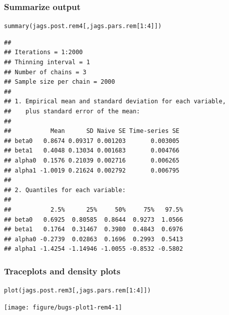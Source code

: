 \documentclass[color=usenames,dvipsnames]{beamer}\usepackage[]{graphicx}\usepackage[]{color}
\makeatletter
\newcommand{\hlnum}[1]{\textcolor[rgb]{0.69,0.494,0}{#1}}%
\newcommand{\hlopt}[1]{\textcolor[rgb]{0,0,0}{#1}}%
\newcommand{\hlstd}[1]{\textcolor[rgb]{0,0,0}{#1}}%
\newcommand{\hlkwd}[1]{\textcolor[rgb]{0.004,0.004,0.506}{#1}}%
\newenvironment{kframe}{%
 \def\at@end@of@kframe{}%
 \ifinner\ifhmode%
  \def\at@end@of@kframe{\end{minipage}}%
  \begin{minipage}{\columnwidth}%
 \fi\fi%
 \def\FrameCommand##1{\hskip\@totalleftmargin \hskip-\fboxsep
 \colorbox{shadecolor}{##1}\hskip-\fboxsep
     \hskip-\linewidth \hskip-\@totalleftmargin \hskip\columnwidth}%
 \MakeFramed {\advance\hsize-\width
   \@totalleftmargin\z@ \linewidth\hsize
   \@setminipage}}%
 {\par\unskip\endMakeFramed%
 \at@end@of@kframe}
\newenvironment{knitrout}{}{} %
\makeatother
\begin{document}
\begin{frame}[fragile]
  \frametitle{Summarize output}
\begin{knitrout}\tiny
{}\color{fgcolor}\begin{kframe}
\begin{alltt}
\hlkwd{summary}\hlstd{(jags.post.rem4[,jags.pars.rem[}\hlnum{1}\hlopt{:}\hlnum{4}\hlstd{]])}
\end{alltt}
\begin{verbatim}
## 
## Iterations = 1:2000
## Thinning interval = 1 
## Number of chains = 3 
## Sample size per chain = 2000 
## 
## 1. Empirical mean and standard deviation for each variable,
##    plus standard error of the mean:
## 
##           Mean      SD Naive SE Time-series SE
## beta0   0.8674 0.09317 0.001203       0.003005
## beta1   0.4048 0.13034 0.001683       0.004766
## alpha0  0.1576 0.21039 0.002716       0.006265
## alpha1 -1.0019 0.21624 0.002792       0.006795
## 
## 2. Quantiles for each variable:
## 
##           2.5%      25%     50%     75%   97.5%
## beta0   0.6925  0.80585  0.8644  0.9273  1.0566
## beta1   0.1764  0.31467  0.3980  0.4843  0.6976
## alpha0 -0.2739  0.02863  0.1696  0.2993  0.5413
## alpha1 -1.4254 -1.14946 -1.0055 -0.8532 -0.5802
\end{verbatim}
\end{kframe}
\end{knitrout}
\end{frame}




\begin{frame}[fragile]
  \frametitle{Traceplots and density plots}
\begin{knitrout}\footnotesize
{}\color{fgcolor}\begin{kframe}
\begin{alltt}
\hlkwd{plot}\hlstd{(jags.post.rem3[,jags.pars.rem[}\hlnum{1}\hlopt{:}\hlnum{4}\hlstd{]])}
\end{alltt}
\end{kframe}

{\centering \texttt{[image: figure/bugs-plot1-rem4-1]} 

}


\end{knitrout}
\end{frame}
\end{document}
